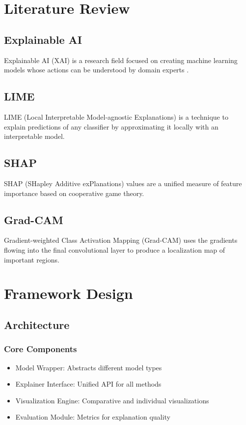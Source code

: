 \documentclass[12pt,a4paper]{report}
\begin{document}
\chapter{Literature Review}

\section{Explainable AI}
Explainable AI (XAI) is a research field focused on creating machine learning models whose actions can be understood by domain experts \cite{samek2017explainable}.

\section{LIME}
LIME (Local Interpretable Model-agnostic Explanations) is a technique to explain predictions of any classifier by approximating it locally with an interpretable model.

\section{SHAP}
SHAP (SHapley Additive exPlanations) values are a unified measure of feature importance based on cooperative game theory.

\section{Grad-CAM}
Gradient-weighted Class Activation Mapping (Grad-CAM) uses the gradients flowing into the final convolutional layer to produce a localization map of important regions.

\chapter{Framework Design}

\section{Architecture}
\subsection{Core Components}
\begin{itemize}
    \item Model Wrapper: Abstracts different model types
    \item Explainer Interface: Unified API for all methods
    \item Visualization Engine: Comparative and individual visualizations
    \item Evaluation Module: Metrics for explanation quality
\end{itemize}
\end{document}
